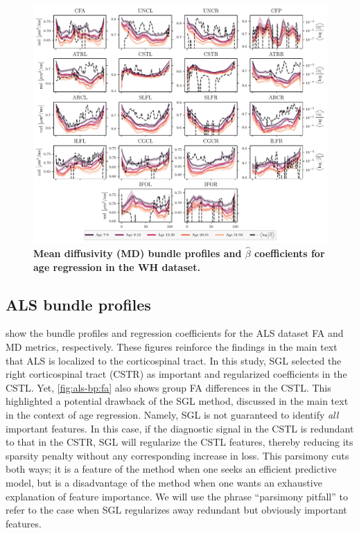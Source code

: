 \documentclass[10pt,%
               aps,%
               prl,%
               reprint,%
               superscriptaddress,%
               preprintnumbers,%
               linenumbers,%
               amsmath,%
               floatfix]{revtex4-2}
\begin{document}
\begin{figure}
    \includegraphics[width=\textwidth]{wh_coefs_profiles_md.pdf}
    \caption{%
        {%
            \bf Mean diffusivity (MD) bundle profiles and $\hat{\beta}$
            coefficients for age regression in the WH dataset.
        }
        \label{fig:wh-bp:md}
    }
\end{figure}

\subsection{ALS bundle profiles}

 show the bundle profiles and regression
coefficients for the ALS dataset FA and MD metrics, respectively. These
figures reinforce the findings in the main text that ALS is localized to the
corticospinal tract. In this study, SGL selected the right corticospinal
tract (CSTR) as important and regularized coefficients in the CSTL. Yet,
\cref{fig:als-bp:fa} also shows group FA differences in the CSTL. This
highlighted a potential drawback of the SGL method, discussed in the main
text in the context of age regression. Namely, SGL is not guaranteed to
identify \emph{all} important features. In this case, if the diagnostic
signal in the CSTL is redundant to that in the CSTR, SGL will regularize the
CSTL features, thereby reducing its sparsity penalty without any
corresponding increase in loss. This parsimony cuts both ways; it is a
feature of the method when one seeks an efficient predictive model, but is a
disadvantage of the method when one wants an exhaustive explanation of feature
importance. We will use the phrase ``parsimony pitfall'' to refer to the
case when SGL regularizes away redundant but obviously important features.
\end{document}
